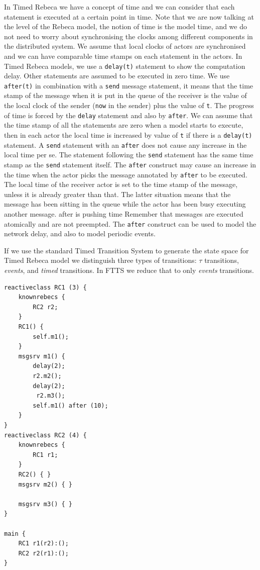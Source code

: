 In Timed Rebeca we have a concept of time and we can consider that each statement is executed at a certain point in time. Note that we are now talking at the level of the Rebeca model, the notion of time is the model time, and we do not need to worry about synchronising the clocks among different components in the distributed system. We assume that local clocks of actors are synchronised and we can have comparable time stamps on each statement in the actors.
%
In Timed Rebeca models, we use a \texttt{delay(t)} statement to show the computation delay. Other statements are assumed to be executed in zero time. We use  \texttt{after(t)} in combination with a \texttt{send} message statement, it means that the time stamp of the message when it is put in the queue of the receiver is the value of the local clock of the sender (\texttt{now} in the sender) plus the value of \texttt{t}.
The progress of time is forced by the \texttt{delay} statement and also by \texttt{after}. 
We can assume that the time stamp of all the statements are zero when a model starts to execute, then in each actor the local time is increased by value of \texttt{t} if there is a \texttt{delay(t)} statement.
A \texttt{send} statement with an  \texttt{after} does not cause any increase in the local time per se. The statement following the \texttt{send} statement has the same time stamp as the \texttt{send} statement itself.
The \texttt{after} construct may cause an increase in the time when the actor picks the message annotated by \texttt{after} to be executed. The local time of the receiver actor is set to the time stamp of the message, unless it is already greater than that.
The latter situation means that the message has been sitting in the queue while the actor has been busy executing another message.
%
after is pushing time
%
Remember that messages are executed atomically and are not preempted.
The \texttt{after} construct can be used to model the network delay, and also to model periodic events.


If we use the standard Timed Transition System to generate the state space for Timed Rebeca model we distinguish three types of transitions: $\tau$ transitions, \textit{events}, and \textit{timed} transitions.
In FTTS we reduce that to only \textit{events} transitions.
%

\begin{lstlisting}[language=rebeca, caption= A simple Timed Rebeca model with two rebecs, label=src::FTTS-actor-model]
reactiveclass RC1 (3) {
	knownrebecs {
		RC2 r2;
	}
	RC1() {
		self.m1();
	}
	msgsrv m1() {
		delay(2);
		r2.m2();
		delay(2);
		 r2.m3();
		self.m1() after (10);
	}
}
reactiveclass RC2 (4) {
	knownrebecs {
		RC1 r1;
	}
	RC2() { }
	msgsrv m2() { }
	
	msgsrv m3() { }
}

main {
	RC1 r1(r2):();
	RC2 r2(r1):();
}

\end{lstlisting}


